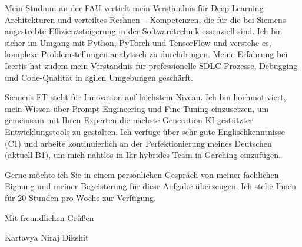 \documentclass[10pt, a4paper]{article}
\begin{document}
\vspace{0.3cm}
\noindent
Mein Studium an der FAU vertieft mein Verständnis für Deep-Learning-Architekturen und verteiltes Rechnen – Kompetenzen, die für die bei Siemens angestrebte Effizienzsteigerung in der Softwaretechnik essenziell sind. Ich bin sicher im Umgang mit Python, PyTorch und TensorFlow und verstehe es, komplexe Problemstellungen analytisch zu durchdringen. Meine Erfahrung bei Icertis hat zudem mein Verständnis für professionelle SDLC-Prozesse, Debugging und Code-Qualität in agilen Umgebungen geschärft.

\vspace{0.3cm}
\noindent
Siemens FT steht für Innovation auf höchstem Niveau. Ich bin hochmotiviert, mein Wissen über Prompt Engineering und Fine-Tuning einzusetzen, um gemeinsam mit Ihren Experten die nächste Generation KI-gestützter Entwicklungstools zu gestalten. Ich verfüge über sehr gute Englischkenntnisse (C1) und arbeite kontinuierlich an der Perfektionierung meines Deutschen (aktuell B1), um mich nahtlos in Ihr hybrides Team in Garching einzufügen.

\vspace{0.3cm}
\noindent
Gerne möchte ich Sie in einem persönlichen Gespräch von meiner fachlichen Eignung und meiner Begeisterung für diese Aufgabe überzeugen. Ich stehe Ihnen für 20 Stunden pro Woche zur Verfügung.

\vspace{0.8cm}

\noindent
Mit freundlichen Grüßen

\vspace{0.8cm}
\noindent
Kartavya Niraj Dikshit
\end{document}
